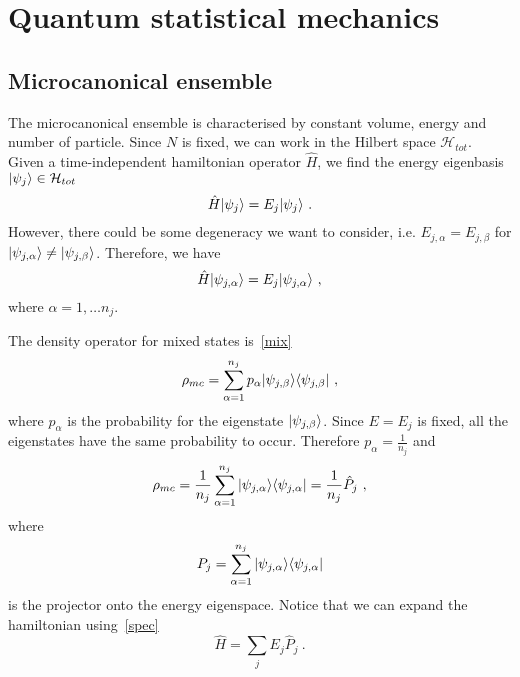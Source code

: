 \part{Quantum statistical mechanics}

\chapter{Microcanonical ensemble}

    The microcanonical ensemble is characterised by constant volume, energy and number of particle. Since $N$ is fixed, we can work in the Hilbert space $\mathcal H_{tot}$. Given a time-independent hamiltonian operator $\hat H$, we find the energy eigenbasis $\vert\psi_j\rangle \in \mathcal H_{tot}$ 
    \begin{equation*}
        \hat H \vert\psi_j\rangle = E_j \vert\psi_j\rangle ~.
    \end{equation*}
    However, there could be some degeneracy we want to consider, i.e. $E_{j,\alpha} = E_{j, \beta}$ for $\vert\psi_{j, \alpha}\rangle \neq \vert\psi_{j, \beta}\rangle$. Therefore, we have 
    \begin{equation}\label{eneigen}
        \hat H \vert\psi_{j,\alpha}\rangle = E_j \vert\psi_{j,\alpha}\rangle ~,
    \end{equation}
    where $\alpha = 1, \ldots n_j$.

    The density operator for mixed states is~\eqref{mix}
    \begin{equation*}
        \rho_{mc} = \sum_{\alpha=1}^{n_j} p_\alpha \vert\psi_{j, \beta}\rangle \langle\psi_{j, \beta}\vert ~,
    \end{equation*}
    where $p_\alpha$ is the probability for the eigenstate $\vert\psi_{j, \beta}\rangle$. Since $E = E_j$ is fixed, all the eigenstates have the same probability to occur. Therefore $p_\alpha = \frac{1}{n_j}$ and 
    \begin{equation*}
        \rho_{mc} = \frac{1}{n_j} \sum_{\alpha=1}^{n_j} \vert\psi_{j, \alpha}\rangle \langle\psi_{j, \alpha}\vert = \frac{1}{n_j} \hat P_j ~,
    \end{equation*}
    where 
    \begin{equation*}
        P_j = \sum_{\alpha=1}^{n_j} \vert\psi_{j, \alpha}\rangle \langle\psi_{j, \alpha}\vert
    \end{equation*} 
    is the projector onto the energy eigenspace. Notice that we can expand the hamiltonian using~\eqref{spec}
    \begin{equation}\label{endec}
        \hat H = \sum_j E_j \hat P_j ~.
    \end{equation}

